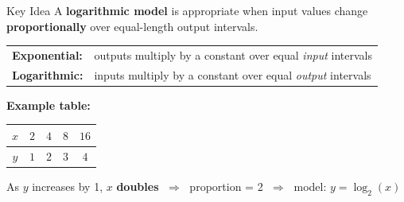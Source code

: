 \documentclass[aspectratio=169, 11pt]{beamer}
\begin{document}
\begin{frame}[t, plain]

  \vspace{0.3cm}
  \begin{block}{Key Idea}
    A \textbf{logarithmic model} is appropriate when input values change
    \textbf{proportionally} over equal-length output intervals.
  \end{block}

  \vspace{0.3cm}
  \renewcommand{\arraystretch}{1.6}
  \begin{tabular}{@{} l @{\quad} l @{}}
    \textbf{Exponential:} & outputs multiply by a constant over equal \emph{input} intervals \\
    \textbf{Logarithmic:} & inputs multiply by a constant over equal \emph{output} intervals \\
  \end{tabular}

  \vspace{0.4cm}
  \textbf{Example table:}

  \vspace{0.2cm}
  \begin{center}
  \renewcommand{\arraystretch}{1.5}
  \begin{tabular}{|c|c|c|c|c|}
  \hline
  $x$ & $2$ & $4$ & $8$ & $16$ \\
  \hline
  $y$ & $1$ & $2$ & $3$ & $4$ \\
  \hline
  \end{tabular}
  \end{center}

  \vspace{0.2cm}
  As $y$ increases by 1, $x$ \textbf{doubles} $\;\Rightarrow\;$ proportion = 2
  $\;\Rightarrow\;$ model: $y = \log_2(x)$
\end{frame}
\end{document}
